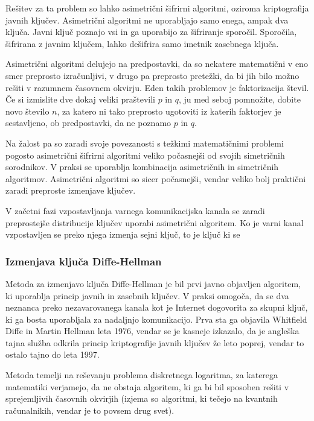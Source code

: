 \documentclass[12pt,a4paper,openany]{book}
\begin{document}
Rešitev za ta problem so lahko asimetrični šifrirni algoritmi, oziroma kriptografija javnih ključev. Asimetrični algoritmi ne uporabljajo samo enega, ampak dva ključa. Javni ključ poznajo vsi in ga uporabijo za šifriranje sporočil. Sporočila, šifrirana z javnim ključem, lahko dešifrira samo imetnik zasebnega ključa.

Asimetrični algoritmi delujejo na predpostavki, da so nekatere matematični v eno smer preprosto izračunljivi, v drugo pa preprosto pretežki, da bi jih bilo možno rešiti v razumnem časovnem okvirju. Eden takih problemov je faktorizacija števil. Če si izmislite dve dokaj veliki praštevili $p$ in $q$, ju med seboj pomnožite, dobite novo število $n$, za katero ni tako preprosto ugotoviti iz katerih faktorjev je sestavljeno, ob predpostavki, da ne poznamo $p$ in $q$.

Na žalost pa so zaradi svoje povezanosti s težkimi matematičnimi problemi pogosto asimetrični šifrirni algoritmi veliko počasnejši od svojih simetričnih sorodnikov. V praksi se uporablja kombinacija asimetričnih in simetričnih algoritmov. Asimetrični algoritmi so sicer počasnejši, vendar veliko bolj praktični zaradi preproste izmenjave ključev.


V začetni fazi vzpostavljanja varnega komunikacijska kanala se zaradi preprostejše distribucije ključev uporabi asimetrični algoritem. Ko je varni kanal vzpostavljen se preko njega izmenja sejni ključ, to je ključ ki se

\subsubsection{Izmenjava ključa Diffe-Hellman}
\label{subs:Izmenjava ključa Diffe-Hellman}


Metoda za izmenjavo ključa Diffe-Hellman je bil prvi javno objavljen algoritem, ki uporablja princip javnih in zasebnih ključev. V praksi omogoča, da se dva neznanca preko nezavarovanega kanala kot je Internet dogovorita za skupni ključ, ki ga bosta uporabljala za nadaljnjo komunikacijo. Prva sta ga objavila Whitfield Diffe in Martin Hellman leta 1976, vendar se je kasneje izkazalo, da je angleška tajna služba odkrila princip kriptografije javnih ključev že leto poprej, vendar to ostalo tajno do leta 1997.

Metoda temelji na reševanju problema diskretnega logaritma, za katerega matematiki verjamejo, da ne obstaja algoritem, ki ga bi bil sposoben rešiti v sprejemljivih časovnih okvirjih (izjema so algoritmi, ki tečejo na kvantnih računalnikih, vendar je to povsem drug svet).
\end{document}
